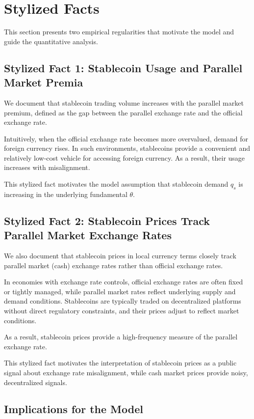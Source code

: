 \section{Stylized Facts}

This section presents two empirical regularities that motivate the model and guide the quantitative analysis.

\subsection{Stylized Fact 1: Stablecoin Usage and Parallel Market Premia}

We document that stablecoin trading volume increases with the parallel market premium, defined as the gap between the parallel exchange rate and the official exchange rate.

Intuitively, when the official exchange rate becomes more overvalued, demand for foreign currency rises. In such environments, stablecoins provide a convenient and relatively low-cost vehicle for accessing foreign currency. As a result, their usage increases with misalignment.

This stylized fact motivates the model assumption that stablecoin demand $q_s$ is increasing in the underlying fundamental $\theta$.

\subsection{Stylized Fact 2: Stablecoin Prices Track Parallel Market Exchange Rates}

We also document that stablecoin prices in local currency terms closely track parallel market (cash) exchange rates rather than official exchange rates.

In economies with exchange rate controls, official exchange rates are often fixed or tightly managed, while parallel market rates reflect underlying supply and demand conditions. Stablecoins are typically traded on decentralized platforms without direct regulatory constraints, and their prices adjust to reflect market conditions.

As a result, stablecoin prices provide a high-frequency measure of the parallel exchange rate.

This stylized fact motivates the interpretation of stablecoin prices as a public signal about exchange rate misalignment, while cash market prices provide noisy, decentralized signals.

\subsection{Implications for the Model}

